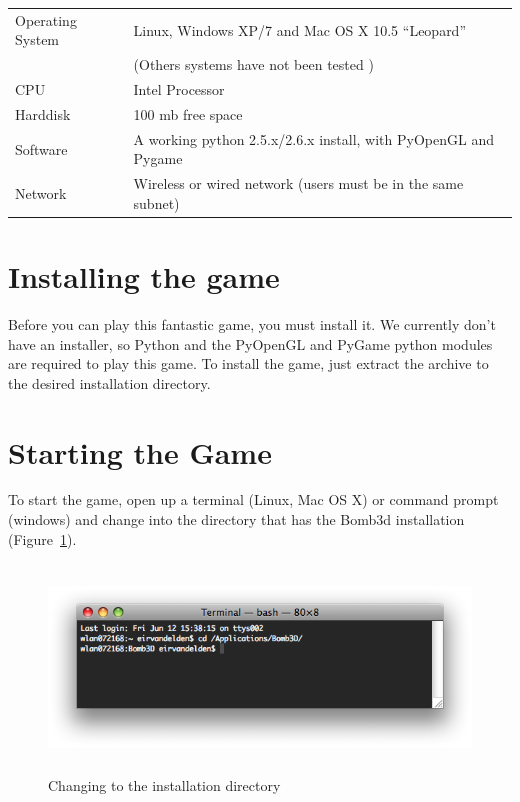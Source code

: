 \documentclass[a4paper,twoside,11pt]{book}
\theoremstyle{plain} \newtheorem{powerup}{Power-Up}
\begin{document}
        \begin{tabular}{l|l}
            Operating System & Linux, Windows XP/7 and Mac OS X 10.5 ``Leopard'' \\
                                 & (Others systems have not been tested )\\
            CPU              & Intel Processor \\
            Harddisk         & 100 mb free space \\
            Software         & A working python 2.5.x/2.6.x install, with PyOpenGL and Pygame\\
            Network          & Wireless or wired network (users must be in the same subnet) 
        \end{tabular}
        
        

    \section{Installing the game} %
    \label{sec:installing_the_game}
        Before you can play this fantastic game, you must install it. We currently don't have an installer, so Python and the PyOpenGL and PyGame python modules are required to play this game. To install the game, just extract the archive to the desired installation directory.

    \section{Starting the Game} %
    \label{sec:starting_the_game}
        To start the game, open up a terminal (Linux, Mac OS X) or command prompt (windows) and change into the directory that has the Bomb3d installation (Figure~\ref{fig:directory}).
        
        \begin{figure}[!ht]
          \centering
          \includegraphics[width=14cm,height=5.5cm]{diagrams/directory}
          \caption{Changing to the installation directory} \label{fig:directory}
        \end{figure}
        
\end{document}
